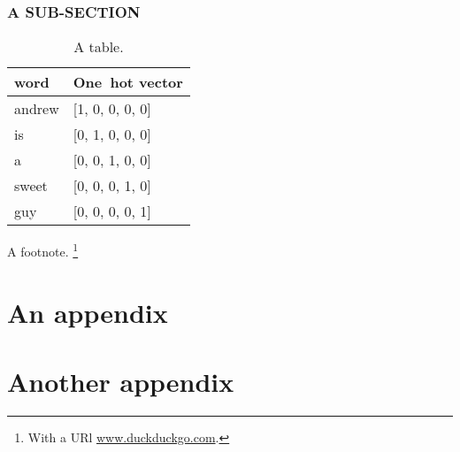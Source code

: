 \documentclass[12pt]{book}
\renewcommand{\&}{\textup{\symbol{`\&}}}
\begin{document}
\subsection{A SUB-SECTION}
\label{sub:sub}

\begin{table}[t]
\centering
  \begin{tabular}{p{3cm}p{3cm}} 
 \hline
 word & One\ hot vector\\
 \hline
 andrew & [1, 0, 0, 0, 0] \\ 
 is & [0, 1, 0, 0, 0] \\

 a & [0, 0, 1, 0, 0] \\

 sweet & [0, 0, 0, 1, 0]\\

 guy & [0, 0, 0, 0, 1]\\ 
 \hline
\end{tabular}
\caption{A table.}
\label{tab:wordnvec}
\end{table}

A footnote.%
\footnote{With a URl \url{www.duckduckgo.com}.}





\appendix

\chapter{An appendix}

\chapter{Another appendix}
\end{document}
